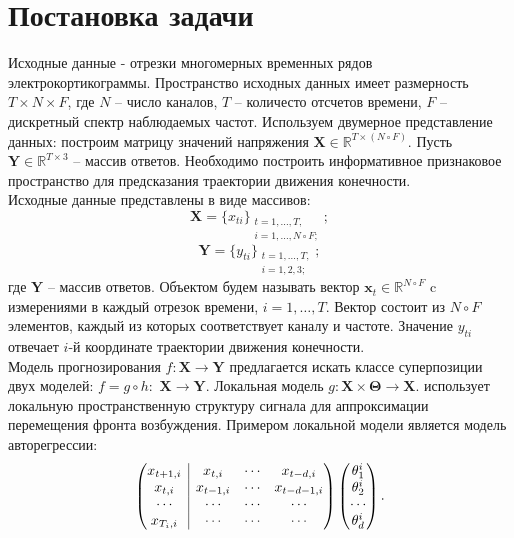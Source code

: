 \documentclass[12pt,twoside]{article}
\begin{document}
\section{Постановка задачи}
Исходные данные - отрезки многомерных временных рядов электрокортикограммы. Пространство исходных данных имеет размерность $T \times N \times F$, где $N$ – число каналов, $T$ – количесто отсчетов времени, $F$ – дискретный спектр наблюдаемых частот. Используем двумерное представление данных: построим матрицу значений напряжения $\mathbf{X} \in \mathbb{R}^{T \times (N \circ F)}$. Пусть $\mathbf{Y} \in \mathbb{R}^{T \times 3}$ – массив ответов. Необходимо построить информативное признаковое пространство для предсказания траектории движения конечности. \\
Исходные данные представлены в виде массивов:
\begin{equation}
\mathbf{X} = \{x_{ti}\}_{\substack{t=1,\dots,T,\\ i=1,\dots,N \circ F;}};
\end{equation} 
\begin{equation}
\mathbf{Y} = \{y_{ti}\}_{\substack{t=1,\dots,T,\\ i=1,2,3;}};
\end{equation}
где $\mathbf{Y}$ – массив ответов. Объектом будем называть вектор $\mathbf{x}_t \in \mathbb{R}^{N \circ F}$ c измерениями в каждый отрезок времени, $i = 1,\dots,T$. Вектор состоит из $N\circ F$ элементов, каждый из которых соответствует каналу и частоте. Значение $y_{ti}$ отвечает $i$-й координате траектории движения конечности.\\
Модель прогнозирования $f:\mathbf{X}\to\mathbf{Y}$ предлагается искать классе суперпозиции двух моделей: $f = g \circ h:$ $\mathbf{X}\to\mathbf{Y}$. Локальная модель $g:\mathbf{X}\times\mathbf{\Theta}\to\mathbf{X}$. использует локальную пространственную структуру сигнала для аппроксимации перемещения фронта возбуждения.
 Примером локальной модели является модель авторегрессии:
\begin{equation}
\left(\begin{array}{@{}c|ccc@{}}
x_{t+1,i} & x_{t,i}   & \cdots & x_{t-d,i}   \\
x_{t,i}   & x_{t-1,i} & \cdots & x_{t-d-1,i} \\
\cdots     & \cdots     & \cdots & \cdots	\\
x_{T_{i},i}   & \cdots     & \cdots & \cdots   \\
\end{array}\right)
\begin{pmatrix}
\theta_1^{i} \\
\theta_2^{i} \\
\cdots \\
\theta_d^{i}
\end{pmatrix}.
\end{equation}
\end{document}
